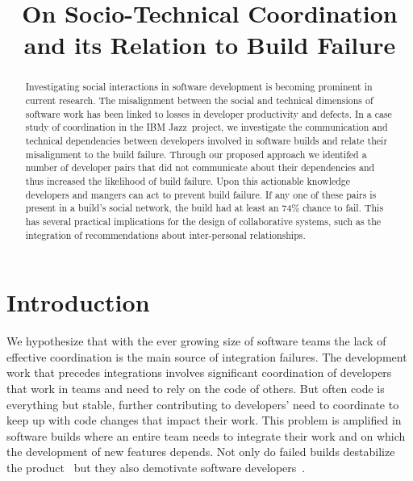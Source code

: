 \documentclass[conference]{IEEEtran}
\begin{document}
\title{On Socio-Technical Coordination and its Relation to Build Failure}


\author{
\and
{}
}

\maketitle


\begin{abstract}
Investigating social interactions in software development is becoming 
prominent in current research. The misalignment
between the social and technical dimensions of software work has been
linked to losses in developer productivity and defects. In a case study of
coordination in the IBM Jazz\texttrademark\ project, we investigate the
communication and technical dependencies between developers involved in
software builds and relate their misalignment to the build failure.  
Through our proposed approach we identifed a number of developer pairs that did not communicate about their dependencies and thus increased the likelihood of build failure. 
Upon this actionable knowledge developers and mangers can act to prevent build failure. 
If any one of these pairs is present in a build's social network, the build had at least an 74\% chance to fail. 
This has several practical implications for the design of collaborative systems, such as the integration of recommendations about inter-personal relationships.
\end{abstract}


\IEEEpeerreviewmaketitle

\section{Introduction}
We hypothesize that with the ever growing size of software teams the lack of
effective coordination is the main source of integration failures. The
development work that precedes integrations involves significant coordination of
developers that work in teams and need to rely on the code of others. 
But often code is everything but stable, further contributing to
developers' need to coordinate to keep up with code changes that impact their work. This problem is
amplified in software builds where an entire team needs to integrate their work
and on which the development of new features depends. Not only do
failed builds destabilize the product~\cite{cusumano1997} but they also demotivate
software developers~\cite{holck2004}.
\end{document}
